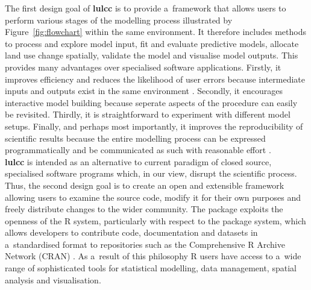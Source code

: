 \documentclass[gmdd, online, hvmath]{copernicus}
\begin{document}
The first design goal of \textbf{lulcc} is to provide a~framework that allows users to perform various stages of the modelling process illustrated by Figure~\ref{fig:flowchart} within the same environment. It therefore includes methods to process and explore model input, fit and evaluate predictive models, allocate land use change spatially, validate the model and visualise model outputs. This provides many advantages over specialised software applications. Firstly, it improves efficiency and reduces the likelihood of user errors because intermediate inputs and outputs exist in the same environment \citep{fiske2011,pebesma2012}. Secondly, it encourages interactive model building because seperate aspects of the procedure can easily be revisited. Thirdly, it is straightforward to experiment with different model setups. Finally, and perhaps most importantly, it improves the reproducibility of scientific results because the entire modelling process can be expressed programmatically and be communicated as such with reasonable effort \citep{pebesma2012}. \\ 

\textbf{lulcc} is intended as an alternative to current paradigm of closed source, specialised software programs which, in our view, disrupt the scientific process. Thus, the second design goal is to create an open and extensible framework allowing users to examine the source code, modify it for their own purposes and freely distribute changes to the wider community. The package exploits the openness of the R system, particularly with respect to the package system, which allows developers to contribute code, documentation and datasets in a~standardised format to repositories such as the Comprehensive R Archive Network (CRAN) \citep{pebesma2012,claes2014}. As a~result of this philosophy R users have access to a~wide range of sophisticated tools for statistical modelling, data management, spatial analysis and visualisation. \\
\end{document}
